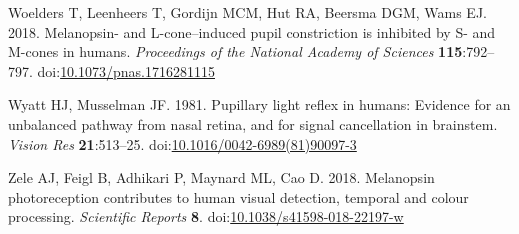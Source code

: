 \documentclass[
]{article}
\newlength{\cslhangindent}
\newlength{\cslentryspacingunit} %
\newenvironment{CSLReferences}[2] %
 {%
  \setlength{\parindent}{0pt}
  \ifodd #1
  \let\oldpar\par
  \def\par{\hangindent=\cslhangindent\oldpar}
  \fi
  \setlength{\parskip}{#2\cslentryspacingunit}
 }%
 {}
\begin{document}
\begin{CSLReferences}{1}{0}
\leavevmode{}%
Woelders T, Leenheers T, Gordijn MCM, Hut RA, Beersma DGM, Wams EJ. 2018. Melanopsin- and {L}-cone--induced pupil constriction is inhibited by {S}- and {M}-cones in humans. \emph{Proceedings of the National Academy of Sciences} \textbf{115}:792--797. doi:\href{https://doi.org/10.1073/pnas.1716281115}{10.1073/pnas.1716281115}

\leavevmode{}%
Wyatt HJ, Musselman JF. 1981. Pupillary light reflex in humans: Evidence for an unbalanced pathway from nasal retina, and for signal cancellation in brainstem. \emph{Vision Res} \textbf{21}:513--25. doi:\href{https://doi.org/10.1016/0042-6989(81)90097-3}{10.1016/0042-6989(81)90097-3}

\leavevmode{}%
Zele AJ, Feigl B, Adhikari P, Maynard ML, Cao D. 2018. Melanopsin photoreception contributes to human visual detection, temporal and colour processing. \emph{Scientific Reports} \textbf{8}. doi:\href{https://doi.org/10.1038/s41598-018-22197-w}{10.1038/s41598-018-22197-w}

\end{CSLReferences}
\end{document}

